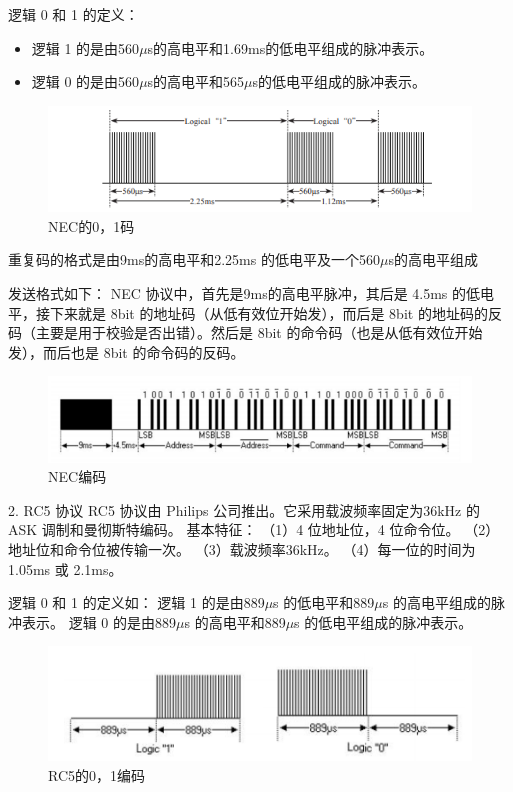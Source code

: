 逻辑 0 和 1 的定义：
\begin{itemize}
	\item 逻辑 1 的是由560$\mu$s的高电平和1.69ms的低电平组成的脉冲表示。
	\item 逻辑 0 的是由560$\mu$s的高电平和565$\mu$s的低电平组成的脉冲表示。
\end{itemize}
\begin{figure}[htbp]
	\centering
	\includegraphics[width=\linewidth]{figure/4-2}
	\caption{NEC的0，1码}
	\label{fig:4-2}
\end{figure}

重复码的格式是由9ms的高电平和2.25ms 的低电平及一个560$\mu$s的高电平组成

发送格式如下：
NEC 协议中，首先是9ms的高电平脉冲，其后是 4.5ms 的低电平，接下来就是 8bit 的地址码（从低有效位开始发），而后是 8bit 的地址码的反码（主要是用于校验是否出错）。然后是 8bit 的命令码（也是从低有效位开始发），而后也是 8bit 的命令码的反码。
\begin{figure}[htbp]
	\centering
	\includegraphics[width=\linewidth]{figure/4-3}
	\caption{NEC编码}
	\label{fig:4-3}
\end{figure}

2. RC5 协议
RC5 协议由 Philips 公司推出。它采用载波频率固定为36kHz 的 ASK 调制和曼彻斯特编码。
基本特征：
（1）4 位地址位，4 位命令位。
（2）地址位和命令位被传输一次。
（3）载波频率36kHz。
（4）每一位的时间为1.05ms 或 2.1ms。

逻辑 0 和 1 的定义如：
逻辑 1 的是由889$\mu$s 的低电平和889$\mu$s 的高电平组成的脉冲表示。
逻辑 0 的是由889$\mu$s 的高电平和889$\mu$s 的低电平组成的脉冲表示。
\begin{figure}[htbp]
	\centering
	\includegraphics[width=\linewidth]{figure/4-4}
	\caption{RC5的0，1编码}
	\label{fig:4-4}
\end{figure}

